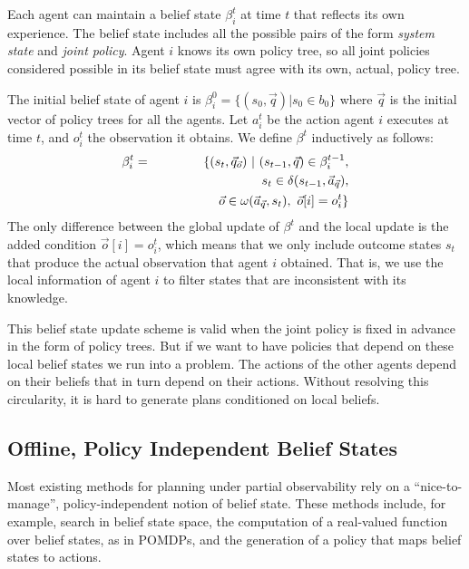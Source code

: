 \documentclass[letterpaper]{article}
\theoremstyle{definition}
\begin{document}
Each agent can maintain a belief state $\beta_i^t$ at time $t$ that reflects its own experience.  The belief state includes all the possible pairs of the form {\em system state} and {\em joint policy}. Agent $i$ knows its own policy tree, so all joint policies considered possible in its belief state must agree with its own, actual, policy tree.

The initial belief state of agent $i$ is $\beta_i^0 = \{(s_0, \vec{q}) | s_0 \in b_0\}$ where $\vec{q}$ is the initial vector of policy trees for all the agents.  Let  $a_i^t$ be the action agent $i$ executes at time $t$, and $o_i^t$ the observation it obtains.
We define $\beta^{t}$ inductively as follows:
\begin{eqnarray}
\scriptsize
  \beta_i^{t}  & = & \{ ( s_t, \vec{q}_{\vec{o}} ) ~|~ (s_{t-1},\vec{q}) \in \beta_i^{t-1}, \\ \nonumber
  & & \hspace{46pt} s_t \in \delta(s_{t-1}, \vec{a}_{\vec{q}}), \\ \nonumber
  & & \hspace{46pt} \vec{o} \in \omega(\vec{a}_{\vec{q}},s_t), ~\vec{o}[i] = o^t_i \}
\end{eqnarray}
The only difference between the global update of $\beta^t$ and the local update is the added condition $\vec{o}[i] = o^t_i$, which means that we only include outcome states $s_t$ that produce the actual observation that agent $i$ obtained.  That is, we use the local information of agent $i$ to filter states that are inconsistent with its knowledge.

This belief state update scheme is valid when the joint policy is fixed in advance in the form of policy trees.  But if we want to have policies that depend on these local belief states we run into a problem.  The actions of the other agents depend on their beliefs that in turn depend on their actions. Without resolving this circularity, it is hard to generate plans conditioned on local beliefs.


\subsection{Offline, Policy Independent Belief States}
Most existing methods for planning under partial observability rely on a ``nice-to-manage'', policy-independent notion of belief state.
These methods include, for example, search in belief state space, the computation of a real-valued function over belief states, as in POMDPs, and the generation of a policy that maps belief states to actions.
\end{document}
